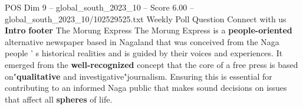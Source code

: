 \begin{textsample}{POS Dim 9 – global\_south\_2023\_10 – Score 6.00 – global\_south\_2023\_10/102529525.txt}
Weekly Poll Question Connect with us \textbf{Intro} \textbf{footer} The Morung Express The Morung Express is a \textbf{people-oriented} alternative newspaper based in Nagaland that was conceived from the Naga people ' s historical realities and is guided by their voices and experiences.
It emerged from the \textbf{well-recognized} concept that the core of a free press is based on"\textbf{qualitative} and investigative"journalism.
Ensuring this is essential for contributing to an informed Naga public that makes sound decisions on issues that affect all \textbf{spheres} of life.

\end{textsample}
